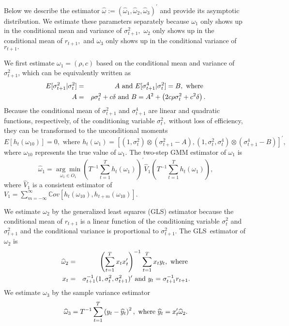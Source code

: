 \documentclass[11pt]{article}
\begin{document}
Below we describe the estimator $\widehat{\omega }:=(\widehat{\omega }_{1},%
\widehat{\omega }_{2},\widehat{\omega }_{3})^{\prime }$ and provide its
asymptotic distribution. We estimate these parameters separately because $%
\omega _{1}$ only shows up in the conditional mean and variance of $\sigma
_{t+1}^{2},$ $\omega _{2}$ only shows up in the conditional mean of $%
r_{t+1}, $ and $\omega _{3}$ only shows up in the conditional variance of $%
r_{t+1}.$

We first estimate $\omega _{1}=(\rho ,c)$ based on the conditional mean and
variance of $\sigma _{t+1}^{2}$, which can be equivalently written as 
\begin{eqnarray}
E[\sigma _{t+1}^{2}|\sigma _{t}^{2}] &=&A\text{ and }E[\sigma
_{t+1}^{4}|\sigma _{t}^{2}]=B,\text{ where }  \notag \\
A &=&\rho \sigma _{t}^{2}+c\delta \text{ and }B=A^{2}+\left( 2c\rho \sigma
_{t}^{2}+c^{2}\delta \right) .
\end{eqnarray}%
Because the conditional mean of $\sigma _{t+1}^{2}$ and $\sigma _{t+1}^{4}$
are linear and quadratic functions, respectively, of the conditioning
variable $\sigma _{t}^{2},$ without loss of efficiency, they can be
transformed to the unconditional moments%
\begin{equation}
E[h_{t}(\omega _{10})]=0,\text{ where }h_{t}(\omega _{1})=[(1,\sigma
_{t}^{2})\otimes (\sigma _{t+1}^{2}-A),(1,\sigma _{t}^{2},\sigma
_{t}^{4})\otimes (\sigma _{t+1}^{4}-B)]^{\prime },
\end{equation}%
where $\omega _{10}$ represents the true value of $\omega _{1}.$ The
two-step GMM estimator of $\omega _{1}$ is%
\begin{equation}
\widehat{\omega }_{1}=\underset{\omega _{1}\in O_{1}}{\arg \min }\left(
T^{-1}\sum_{t=1}^{T}h_{t}(\omega _{1})\right) ^{\prime }\widehat{V}%
_{1}\left( T^{-1}\sum_{t=1}^{T}h_{t}(\omega _{1})\right) ,
\label{omega 1 est}
\end{equation}%
where $\widehat{V}_{1}$ is a consistent estimator of $V_{1}=\sum_{m=-\infty
}^{\infty }\mathbb{C}ov[h_{t}(\omega _{10}),h_{t+m}(\omega _{10})].$

We estimate $\omega _{2}$ by the generalized least squares (GLS) estimator
because the conditional mean of $r_{t+1}$ is a linear function of the
conditioning variable $\sigma _{t}^{2}$ and $\sigma _{t+1}^{2}$ and the
conditional variance is proportional to $\sigma _{t+1}^{2}.$ The GLS\
estimator of $\omega _{2}$ is%
\begin{eqnarray}
\widehat{\omega }_{2} &=&\left( \sum_{t=1}^{T}x_{t}x_{t}^{\prime }\right)
^{-1}\sum_{t=1}^{T}x_{t}y_{t},\text{ where }  \notag \\
x_{t} &=&\sigma _{t+1}^{-1}(1,\sigma _{t}^{2},\sigma _{t+1}^{2})^{\prime }%
\text{ and }y_{t}=\sigma _{t+1}^{-1}r_{t+1}.  \label{omega 2 est}
\end{eqnarray}%
We estimate $\omega _{3}$ by the sample variance estimator%
\begin{equation}
\widehat{\omega }_{3}=T^{-1}\sum_{t=1}^{T}\left( y_{t}-\widehat{y}%
_{t}\right) ^{2},\text{ where }\widehat{y}_{t}=x_{t}^{\prime }\widehat{%
\omega }_{2}.  \label{omega 3 est}
\end{equation}
\end{document}
